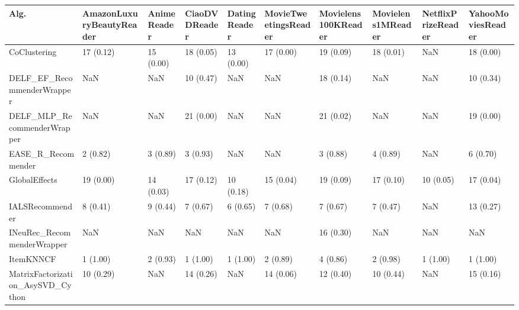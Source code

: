 \begin{tabular}{llllllllll}
\toprule
                               Alg. & AmazonLuxuryBeautyReader & AnimeReader & CiaoDVDReader & DatingReader & MovieTweetingsReader & Movielens100KReader & Movielens1MReader & NetflixPrizeReader & YahooMoviesReader \\
\midrule
                       CoClustering &                17 (0.12) &   15 (0.00) &     18 (0.05) &    13 (0.00) &            17 (0.00) &           19 (0.09) &         18 (0.01) &                NaN &         18 (0.00) \\
         DELF\_EF\_RecommenderWrapper &                      NaN &         NaN &     10 (0.47) &          NaN &                  NaN &           18 (0.14) &               NaN &                NaN &         10 (0.34) \\
        DELF\_MLP\_RecommenderWrapper &                      NaN &         NaN &     21 (0.00) &          NaN &                  NaN &           21 (0.02) &               NaN &                NaN &         19 (0.00) \\
                 EASE\_R\_Recommender &                 2 (0.82) &    3 (0.89) &      3 (0.93) &          NaN &                  NaN &            3 (0.88) &          4 (0.89) &                NaN &          6 (0.70) \\
                      GlobalEffects &                19 (0.00) &   14 (0.03) &     17 (0.12) &    10 (0.18) &            15 (0.04) &           19 (0.09) &         17 (0.10) &          10 (0.05) &         17 (0.04) \\
                    IALSRecommender &                 8 (0.41) &    9 (0.44) &      7 (0.67) &     6 (0.65) &             7 (0.68) &            7 (0.67) &          7 (0.47) &                NaN &         13 (0.27) \\
         INeuRec\_RecommenderWrapper &                      NaN &         NaN &           NaN &          NaN &                  NaN &           16 (0.30) &               NaN &                NaN &               NaN \\
                          ItemKNNCF &                 1 (1.00) &    2 (0.93) &      1 (1.00) &     1 (1.00) &             2 (0.89) &            4 (0.86) &          2 (0.98) &           1 (1.00) &          1 (1.00) \\
  MatrixFactorization\_AsySVD\_Cython &                10 (0.29) &         NaN &     14 (0.26) &          NaN &            14 (0.06) &           12 (0.40) &         10 (0.44) &                NaN &         15 (0.16) \\

\end{tabular}
